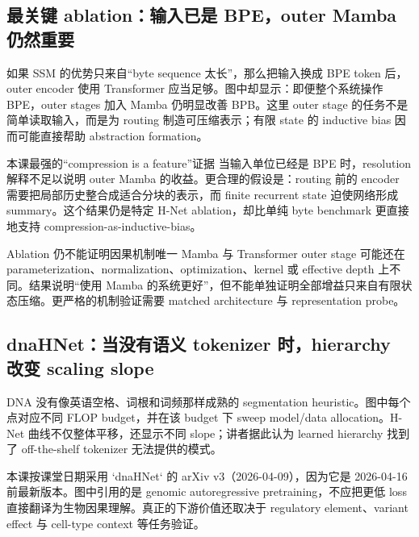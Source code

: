 \subsection{最关键 ablation：输入已是 BPE，outer Mamba 仍然重要}

如果 SSM 的优势只来自“byte sequence 太长”，那么把输入换成 BPE token 后，outer encoder 使用 Transformer 应当足够。图中却显示：即便整个系统操作 BPE，outer stages 加入 Mamba 仍明显改善 BPB。这里 outer stage 的任务不是简单读取输入，而是为 routing 制造可压缩表示；有限 state 的 inductive bias 因而可能直接帮助 abstraction formation。


\begin{importantbox}{本课最强的“compression is a feature”证据}
当输入单位已经是 BPE 时，resolution 解释不足以说明 outer Mamba 的收益。更合理的假设是：routing 前的 encoder 需要把局部历史整合成适合分块的表示，而 finite recurrent state 迫使网络形成 summary。这个结果仍是特定 H-Net ablation，却比单纯 byte benchmark 更直接地支持 compression-as-inductive-bias。
\end{importantbox}

\begin{warningbox}{Ablation 仍不能证明因果机制唯一}
Mamba 与 Transformer outer stage 可能还在 parameterization、normalization、optimization、kernel 或 effective depth 上不同。结果说明“使用 Mamba 的系统更好”，但不能单独证明全部增益只来自有限状态压缩。更严格的机制验证需要 matched architecture 与 representation probe。
\end{warningbox}

\subsection{dnaHNet：当没有语义 tokenizer 时，hierarchy 改变 scaling slope}

DNA 没有像英语空格、词根和词频那样成熟的 segmentation heuristic。图中每个点对应不同 FLOP budget，并在该 budget 下 sweep model/data allocation。H-Net 曲线不仅整体平移，还显示不同 slope；讲者据此认为 learned hierarchy 找到了 off-the-shelf tokenizer 无法提供的模式。


本课按课堂日期采用 `dnaHNet` 的 arXiv v3（2026-04-09），因为它是 2026-04-16 前最新版本。图中引用的是 genomic autoregressive pretraining，不应把更低 loss 直接翻译为生物因果理解。真正的下游价值还取决于 regulatory element、variant effect 与 cell-type context 等任务验证。

